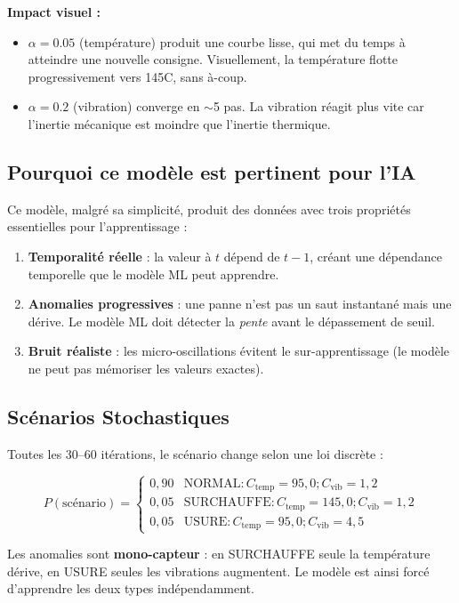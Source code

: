 \documentclass[11pt,a4paper]{article}
\begin{document}
\textbf{Impact visuel :}
\begin{itemize}
    \item $\alpha = 0.05$ (température) produit une courbe lisse, qui met du temps à atteindre une nouvelle consigne. Visuellement, la température \og flotte \fg{} progressivement vers 145\textdegree C, sans à-coup.
    \item $\alpha = 0.2$ (vibration) converge en $\sim$5 pas. La vibration réagit plus vite car l'inertie mécanique est moindre que l'inertie thermique.
\end{itemize}

\subsection{Pourquoi ce modèle est pertinent pour l'IA}

Ce modèle, malgré sa simplicité, produit des données avec trois propriétés essentielles pour l'apprentissage :

\begin{enumerate}
    \item \textbf{Temporalité réelle} : la valeur à $t$ dépend de $t-1$, créant une dépendance temporelle que le modèle ML peut apprendre.
    \item \textbf{Anomalies progressives} : une panne n'est pas un saut instantané mais une dérive. Le modèle ML doit détecter la \emph{pente} avant le dépassement de seuil.
    \item \textbf{Bruit réaliste} : les micro-oscillations évitent le sur-apprentissage (le modèle ne peut pas mémoriser les valeurs exactes).
\end{enumerate}

\subsection{Scénarios Stochastiques}

Toutes les 30--60 itérations, le scénario change selon une loi discrète :

\[
P(\text{scénario}) =
\begin{cases}
0,90 & \text{NORMAL} : C_{\text{temp}} = 95,0 ; C_{\text{vib}} = 1,2 \\
0,05 & \text{SURCHAUFFE} : C_{\text{temp}} = 145,0 ; C_{\text{vib}} = 1,2 \\
0,05 & \text{USURE} : C_{\text{temp}} = 95,0 ; C_{\text{vib}} = 4,5
\end{cases}
\]

Les anomalies sont \textbf{mono-capteur} : en SURCHAUFFE seule la température dérive, en USURE seules les vibrations augmentent. Le modèle est ainsi forcé d'apprendre les deux types indépendamment.
\end{document}
